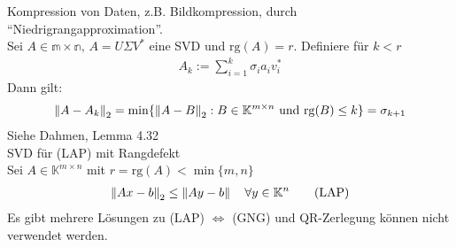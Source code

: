 Kompression von Daten, z.B. Bildkompression, durch ``Niedrigrangapproximation''.\\
\satz Sei $A \in \mathbb{m \times n},\, A = U \Sigma V^*$ eine SVD und $\mathrm{rg}(A) = r$.
Definiere für $k < r$
\begin{align*}
  A_k := \sum^{k}_{i=1} \sigma_i a_i v_i^*
\end{align*}
Dann gilt:
\begin{align*}
  \left\lVert A - A_k \right\rVert_2 = \min \{ \left\lVert A - B \right\rVert_2: B \in \mathbb{K}^{m \times n} \text{ und } \mathrm{rg}(B) \leq k \} = \sigma_{k+1}
\end{align*}
\beweis Siehe Dahmen, Lemma 4.32\\

SVD für (LAP) mit Rangdefekt\\
Sei $A \in \mathbb{K}^{m \times n}$ mit $r = \mathrm{rg}(A) < \min \{m,n\}$
\begin{align*}
  \left\lVert Ax - b \right\rVert_2 \leq \left\lVert Ay - b \right\rVert \quad \forall y \in \mathbb{K}^n \tag{LAP}
\end{align*}
Es gibt mehrere Lösungen zu (LAP) $\Leftrightarrow$ (GNG) und QR-Zerlegung können nicht verwendet werden.


























